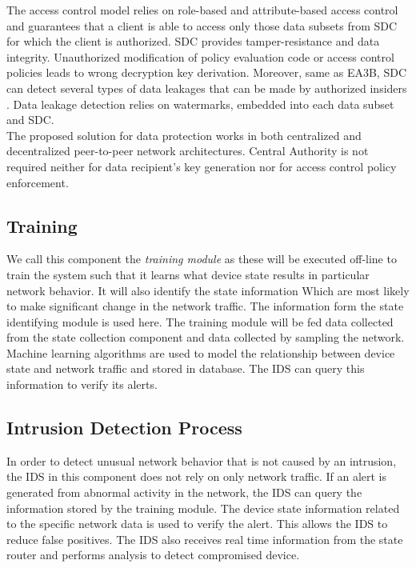 \documentclass[conference]{IEEEtran}
\begin{document}
The access control model relies on role-based and attribute-based access control and guarantees that a client is able to access only those data subsets from SDC for which the client is authorized. SDC provides tamper-resistance and data integrity. Unauthorized modification of policy evaluation code or access control policies leads to wrong decryption key derivation. Moreover, same as EA3B, SDC can detect several types of data leakages that can be made by authorized insiders \cite{c6}. Data leakage detection relies on watermarks, embedded into each data subset and SDC. \\ 
The proposed solution for data protection works in both centralized and decentralized peer-to-peer network architectures. Central Authority is not required neither for data recipient’s key generation nor for access control policy enforcement.

\subsection{Training}
We call this component the {\em training module} as these will be executed off-line to train the system such that it learns what device state results in particular network behavior. It will also identify the state information Which are most likely to make significant change in the network traffic. The information form the state identifying module is used here. The training module will be fed data collected from the state collection component and data collected by sampling the network. Machine learning algorithms are used to model the relationship between device state and network traffic and stored in  database. The IDS can query this information to verify its alerts.

\subsection{Intrusion Detection Process}
In order to detect unusual network behavior that is not caused by an intrusion, the IDS in this component does not rely on only network traffic. If an alert is generated from abnormal activity in the network, the IDS can query the information stored by the training module. The device state information related to the specific network data is used to verify the alert. This allows the IDS to reduce false positives. The IDS also receives real time information from the state router and performs analysis to detect compromised device. 
\end{document}
